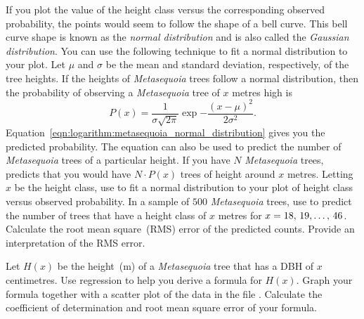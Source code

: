 \documentclass[a4paper,oneside,12pt]{article}
\begin{document}
\begin{problem}
\begin{packedenum}
  \item\label{subprob:logistic:metasequoia_height_normal_plot}
    If you plot the value of the height class versus the corresponding
    observed probability, the points would seem to follow the shape of
    a bell curve.  This bell curve shape is known as the
    \emph{normal distribution} and is also called the
    \emph{Gaussian distribution}.  You can use the following technique
    to fit a normal distribution to your plot.  Let $\mu$ and $\sigma$
    be the mean and standard deviation, respectively, of the tree
    heights.  If the heights of \emph{Metasequoia} trees follow a
    normal distribution, then the probability of observing a
    \emph{Metasequoia} tree of $x$ metres high is
    \begin{equation}
    \label{eqn:logarithm:metasequoia_normal_distribution}
    P(x)
    =
    \frac{1}{\sigma \sqrt{2 \pi}}
    \exp{
      -
      \frac{
        (x - \mu)^2
      }{
        2 \sigma^2
      }
    }.
    \end{equation}
    Equation~\eqref{eqn:logarithm:metasequoia_normal_distribution}
    gives you the predicted probability.  The equation can also be
    used to predict the number of \emph{Metasequoia} trees of a
    particular height.  If you have $N$ \emph{Metasequoia} trees,
     predicts
    that you would have $N \cdot P(x)$ trees of height around $x$
    metres.   Letting $x$ be the height class, use
     to fit a
    normal distribution to your plot of height class versus observed
    probability.  In a sample of $500$ \emph{Metasequoia} trees, use
     to
    predict the number of trees that have a height class of $x$
    metres for $x = {18},\, {19}, \dots,\, {46}$.  Calculate the root mean
    square~(RMS) error of the predicted counts.  Provide an
    interpretation of the RMS error.

  \item\label{subprob:logistic:metasequoia_formula}
    Let $H(x)$ be the height~(m) of a \emph{Metasequoia} tree that has
    a DBH of $x$ centimetres.  Use regression to help you derive a
    formula for $H(x)$.  Graph your formula together with a scatter
    plot of the data in the file .  Calculate
    the coefficient of determination and root mean square error of
    your formula.
  \end{packedenum}
\end{problem}
\end{document}
